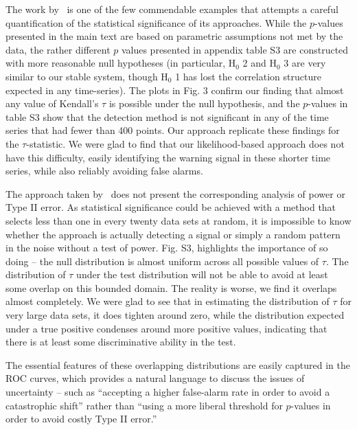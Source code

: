 \documentclass[authoryear, preprint,review,12pt]{elsarticle}
\begin{document}
The work by~\citet{Dakos2008} is one of the few commendable examples that attempts a careful quantification of the statistical significance of its approaches.  While the $p$-values presented in the main text are based on parametric assumptions not met by the data, the rather different $p$ values presented in appendix table S3 are constructed with more reasonable null hypotheses (in particular, H$_0$ 2 and H$_0$ 3 are very similar to our stable system, though H$_0$ 1 has lost the correlation structure expected in any time-series).  The plots in Fig. 3 confirm our finding that almost any value of Kendall's $\tau$ is possible under the null hypothesis, and the $p$-values in table S3 show that the detection method is not significant in any of the time series that had fewer than 400 points.  Our approach replicate these findings for the $\tau$-statistic.  We were glad to find that our likelihood-based approach does not have this difficulty, easily identifying the warning signal in these shorter time series, while also reliably avoiding false alarms.  

The approach taken by~\citet{Dakos2008} does not present the corresponding analysis of power or Type II error.  As statistical significance could be achieved with a method that selects less than one in every twenty data sets at random, it is impossible to know whether the approach is actually detecting a signal or simply a random pattern in the noise without a test of power.  Fig. S3, highlights the importance of so doing -- the null distribution is almost uniform across all possible values of $\tau$.  The distribution of $\tau$ under the test distribution will not be able to avoid at least some overlap on this bounded domain.  The reality is worse, we find it overlaps almost completely.  We were glad to see that in estimating the distribution of $\tau$ for very large data sets, it does tighten around zero, while the distribution expected under a true positive condenses around more positive values, indicating that there is at least some discriminative ability in the test. 

The essential features of these overlapping distributions are easily captured in the ROC curves, which provides a natural language to discuss the issues of uncertainty -- such as ``accepting a higher false-alarm rate in order to avoid a catastrophic shift'' rather than ``using a more liberal threshold for $p$-values in order to avoid costly Type II error.''  %
\end{document}
